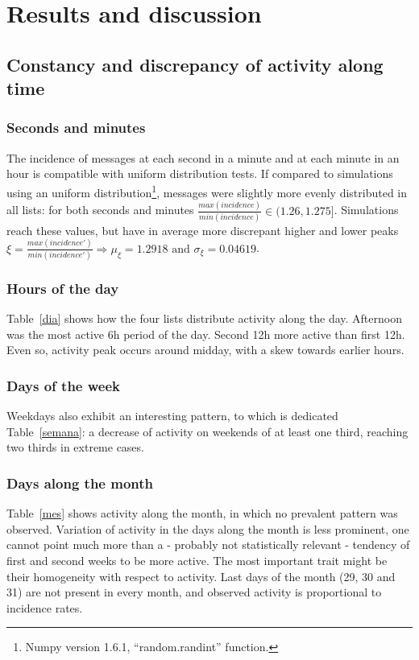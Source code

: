 \documentclass[%
 aip,
 jmp,%
 amsmath,amssymb,
 reprint,%
]{revtex4-1}
\begin{document}
\section{Results and discussion}
    \subsection{Constancy and discrepancy of activity along time}\label{constDisc}
        \subsubsection{Seconds and minutes}
The incidence of messages at each second in a minute and at each minute in an hour is compatible with uniform distribution tests.
If compared to simulations using an uniform distribution\footnote{Numpy version 1.6.1, ``random.randint'' function.}, messages were slightly more evenly distributed in all lists: for both seconds and minutes  $\frac{max(incidence)}{min(incidence)} \in (1.26,1.275]$. Simulations reach these values, but have in average more discrepant higher and lower peaks $\xi=\frac{max(incidence')}{min(incidence')} \Rightarrow \mu_\xi=1.2918 \text{ and } \sigma_\xi=0.04619$.

        \subsubsection{Hours of the day}
Table~\ref{dia} shows how the four lists distribute activity along the day.
Afternoon was the most active 6h period of the day. Second 12h more active than first 12h. Even so, activity peak occurs around midday, with a skew towards earlier hours.


        \subsubsection{Days of the week}
 Weekdays also exhibit an interesting pattern, to which is dedicated Table~\ref{semana}: a decrease of activity on weekends of at least one third, reaching two thirds in extreme cases.
        \subsubsection{Days along the month}
 Table~\ref{mes} shows activity along the month, in which no prevalent pattern was observed.
 Variation of activity in the days along the month is less prominent, one cannot point much more than a - probably not statistically relevant - tendency of first and second weeks to be more active. The most important trait might be their homogeneity with respect to activity. Last days of the month (29, 30 and 31) are not present in every month, and observed activity is proportional to incidence rates.
\end{document}
